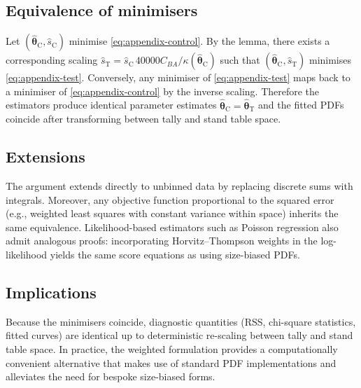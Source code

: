 \subsection{Equivalence of minimisers}

Let $(\hat{\boldsymbol{\theta}}_{\mathrm{C}}, \hat{s}_{\mathrm{C}})$ minimise
\eqref{eq:appendix-control}. By the lemma, there exists a corresponding scaling
$\hat{s}_{\mathrm{T}} = \hat{s}_{\mathrm{C}}\, 40000 C_{BA}/\kappa(\hat{\boldsymbol{\theta}}_{\mathrm{C}})$
such that $(\hat{\boldsymbol{\theta}}_{\mathrm{C}}, \hat{s}_{\mathrm{T}})$ minimises
\eqref{eq:appendix-test}. Conversely, any minimiser of
\eqref{eq:appendix-test} maps back to a minimiser of \eqref{eq:appendix-control}
by the inverse scaling. Therefore the estimators produce identical parameter
estimates $\hat{\boldsymbol{\theta}}_{\mathrm{C}} = \hat{\boldsymbol{\theta}}_{\mathrm{T}}$ and
the fitted PDFs coincide after transforming between tally and stand table space.

\subsection{Extensions}

The argument extends directly to unbinned data by replacing discrete sums with
integrals. Moreover, any objective function proportional to the squared error
(e.g., weighted least squares with constant variance within space) inherits the
same equivalence. Likelihood-based estimators such as Poisson regression also
admit analogous proofs: incorporating Horvitz--Thompson weights in the log-
likelihood yields the same score equations as using size-biased PDFs.

\subsection{Implications}

Because the minimisers coincide, diagnostic quantities (RSS, chi-square
statistics, fitted curves) are identical up to deterministic re-scaling between
tally and stand table space. In practice, the weighted formulation provides a
computationally convenient alternative that makes use of standard PDF
implementations and alleviates the need for bespoke size-biased forms.
